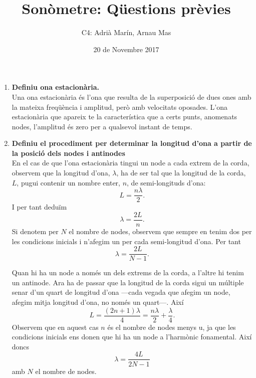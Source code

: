 \documentclass[12pt, a4paper]{article}
\title{Sonòmetre: Qüestions prèvies}
\author{C4: Adrià Marín, Arnau Mas}
\date{20 de Novembre 2017}
\begin{document}
\maketitle

\begin{enumerate}
	\item \textbf{Definiu ona estacionària.} \\
	\indent Una ona estacionària és l'ona que resulta de la superposició de dues ones amb la mateixa freqüència i amplitud, però amb velocitats oposades. L'ona estacionària que apareix te la característica que a certs punts, anomenats nodes, l'amplitud és zero per a qualsevol instant de temps.
	\item \textbf{Definiu el procediment per determinar la longitud d'ona a partir de la posició dels nodes i antinodes} \\
	\indent En el cas de que l'ona estacionària tingui un node a cada extrem de la corda, observem que la longitud d'ona, \( \lambda \), ha de ser tal que la longitud de la corda, \( L \), pugui contenir un nombre enter, \( n \), de semi-longituds d'ona:
\begin{equation*}
  L = \dfrac{n\lambda}{2}.
\end{equation*}
I per tant deduïm
\begin{equation*}
  \lambda = \dfrac{2L}{n}.
\end{equation*}
Si denotem per \( N \) el nombre de nodes, observem que sempre en tenim dos per les condicions inicials i n'afegim un per cada semi-longitud d'ona. Per tant
\begin{equation*}
  \lambda = \dfrac{2L}{N-1}.
\end{equation*}

Quan hi ha un node a només un dels extrems de la corda, a l'altre hi tenim un antinode. Ara ha de passar que la longitud de la corda sigui un múltiple senar d'un quart de longitud d'ona ---cada vegada que afegim un node, afegim mitja longitud d'ona, no només un quart---. Així
\begin{equation*}
  L = \dfrac{(2n + 1)\lambda}{4} = \dfrac{n\lambda}{2} + \dfrac{\lambda}{4}.
\end{equation*}
Observem que en aquest cas \( n \) és el nombre de nodes menys u, ja que les condicions inicials ens donen que hi ha un node a l'harmònic fonamental. Així doncs
\begin{equation*}
  \lambda = \dfrac{4L}{2N - 1}
\end{equation*}
amb \( N \) el nombre de nodes.


\end{enumerate}
\end{document}
